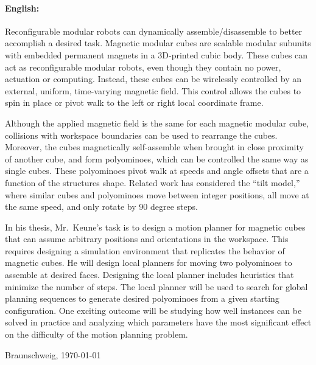 \documentclass[11pt,a4paper,twoside,titlepage]{scrbook}
\theoremstyle{definition}
\begin{document}
\newpage

\paragraph{English:}
Reconfigurable modular robots can dynamically assemble/disassemble to better accomplish a desired task.
Magnetic modular cubes are scalable modular subunits with embedded permanent magnets in a 3D-printed cubic body.
These cubes can act as reconfigurable modular robots, even though they contain no power, actuation or computing.
Instead, these cubes can be wirelessly controlled by an external, uniform, time-varying magnetic field.
This control allows the cubes to spin in place or pivot walk to the left or right local coordinate frame.
 
Although the applied magnetic field is the same for each magnetic modular cube, collisions with workspace boundaries can be used to rearrange the cubes.
Moreover, the cubes magnetically self-assemble when brought in close proximity of another cube, and form polyominoes, which can be controlled the same way as single cubes. 
These polyominoes pivot walk at speeds and angle offsets that are a function of the structures shape. 
Related work has considered the ``tilt model,'' where similar cubes and polyominoes move between integer positions, all move at the same speed, and only rotate by 90 degree steps.

In his thesis, Mr.\ Keune's task is to design a motion planner for magnetic cubes that can assume arbitrary positions and orientations in the workspace.
This requires designing a simulation environment that replicates the behavior of magnetic cubes.
He will design local planners for moving two polyominoes to assemble at desired faces.
Designing the local planner includes heuristics that minimize the number of steps.
The local planner will be used to search for global planning sequences to generate desired polyominoes from a given starting configuration.
One exciting outcome will be studying how well instances can be solved in practice and analyzing which parameters have the most significant effect on the difficulty of the motion planning problem. 

\par
\vfill
\bigskip\noindent Braunschweig, \today \par
\vspace*{10mm}
\hfill\hrulefill


	
	
	\tableofcontents
	
	\listoffigures
	
	
	
	\mainmatter
	
	
	
	
	
	
	
	
	
	
	
\end{document}
